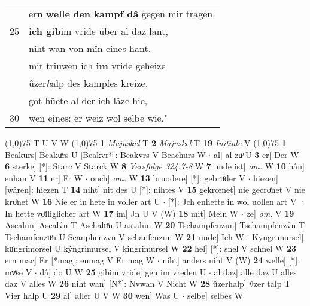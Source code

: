 \documentclass[8pt,a4paper,notitlepage]{article}
\begin{document}
\begin{table}[ht]
\begin{minipage}[t]{0.5\linewidth}
\begin{tabular}{rl}
 & er\textbf{n} \textbf{welle} \textbf{den} \textbf{kampf dâ} gegen mir tragen.\\ 
25 & \textbf{ich gib}im vride über al daz lant,\\ 
 & niht wan von mîn eines hant.\\ 
 & mit triuwen ich \textbf{im} vride geheize\\ 
 & ûzer\textit{h}alp des kampfes kreize.\\ 
 & got hüete al der ich lâze hie,\\ 
30 & wen eines: er weiz wol selbe wie."\\ 
\end{tabular}
\scriptsize
\line(1,0){75} \newline
T U V W \newline
\line(1,0){75} \newline
\textbf{1} \textit{Majuskel} T  \textbf{2} \textit{Majuskel} T  \textbf{19} \textit{Initiale} V  \newline
\line(1,0){75} \newline
\textbf{1} Beakurs] Beakuͦrs U [Beakvr*]: Beakvrs V Beachurs W  $\cdot$ al] al zuͦ U \textbf{3} er] Der W \textbf{6} sterke] [*]: Starc V Starck W \textbf{8} \textit{Versfolge 324.7-8} W  \textbf{7} unde ist] \textit{om.} W \textbf{10} hân] enhan V \textbf{11} er] Fr W  $\cdot$ ouch] \textit{om.} W \textbf{13} bruodere] [*]: gebruͦder V  $\cdot$ hiezen] [wâren]: hiezen T \textbf{14} niht] nit des U [*]: nihtes V \textbf{15} gekrœnet] nie gecroͤnet V nie kroͤnet W \textbf{16} Nie er in hete in voller art U  $\cdot$ [*]: Jch enhette in wol uollen art V · In hette voͤlliglicher art W \textbf{17} im] Jn U V (W) \textbf{18} mit] Mein W  $\cdot$ ze] \textit{om.} V \textbf{19} Ascalun] Ascalv̂n T Aschaluͦn U astalun W \textbf{20} Tschampfenzun] Tschampfenzv̂n T Tschamfenzuͦn U Scanphenzvn V schanfenzun W \textbf{21} unde] Ich W  $\cdot$ Kyngrimursel] kuͦngrimorsel U kẏngrimursel V kingrimursel W \textbf{22} hel] [*]: snel V schnel W \textbf{23} ern mac] Er [*mag]: enmag V Er mag W  $\cdot$ niht] anders niht V (W) \textbf{24} welle] [*]: mvͤse V  $\cdot$ dâ] do U W \textbf{25} gibim vride] gen im vreden U  $\cdot$ al daz] alle daz U alles daz V alles W \textbf{26} niht wan] [N*]: Nvwan V Nicht W \textbf{28} ûzerhalp] v̂zer talp T Vier halp U \textbf{29} al] aller U V W \textbf{30} wen] Was U  $\cdot$ selbe] selbes W \newline
\end{minipage}
\end{table}
\end{document}
